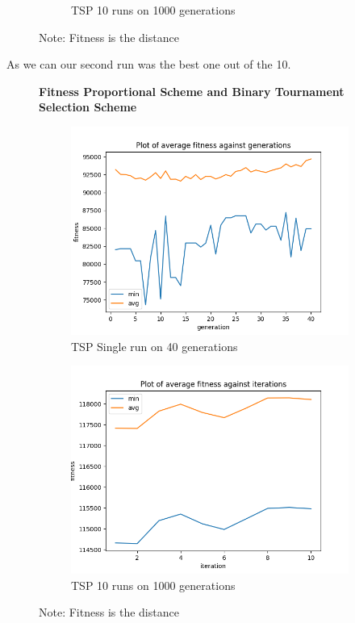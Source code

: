 \documentclass[a4paper]{exam}
\begin{document}
\begin{questions}
\begin{figure}[H]
\begin{subfigure}{.5\textwidth}
      \caption{TSP 10 runs on 1000 generations}
      \label{fig:tsp_fps_tn_sub2}
    \end{subfigure}
    \caption{Note: Fitness is the distance}
    \label{fig:tsp_fps_tn}
  \end{figure}

  As we can our second run was the best one out of the 10.

  \begin{figure}[H]
    \centering
    \textbf{Fitness Proportional Scheme and Binary Tournament Selection Scheme}
    \begin{subfigure}{.5\textwidth}
      \centering
      \includegraphics[width=1\linewidth]{images/tsp_fps_bt_gen.png}
      \caption{TSP Single run on 40 generations}
      \label{fig:tsp_fps_bt_sub1}
    \end{subfigure}%
    \begin{subfigure}{.5\textwidth}
      \centering
      \includegraphics[width=1\linewidth]{images/tsp_fps_bt_itr.png}
      \caption{TSP 10 runs on 1000 generations}
      \label{fig:tsp_fps_bt_sub2}
    \end{subfigure}
    \caption{Note: Fitness is the distance}
    \label{fig:tsp_fps_bt}
  \end{figure}


\end{questions}
\end{document}
